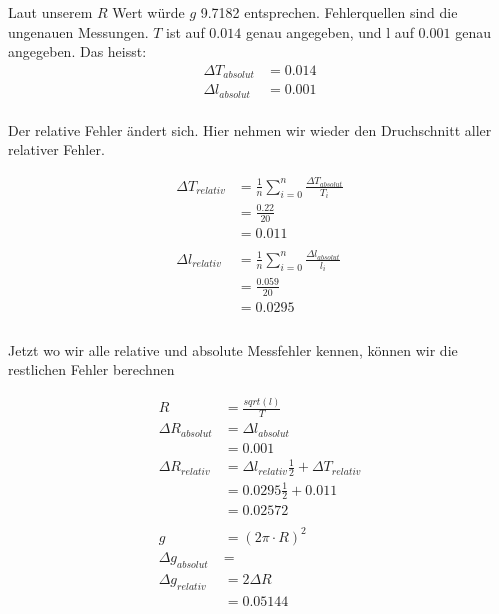 \documentclass[12pt, a4paper, twoside]{article}
\begin{document}
Laut unserem $R$ Wert würde $g$ 9.7182 entsprechen. Fehlerquellen sind die ungenauen Messungen.
$T$ ist auf $0.014$ genau angegeben, und l auf $0.001$ genau angegeben.
Das heisst:
\begin{align*}
  \Delta T_{absolut} & = 0.014 \\
  \Delta l_{absolut} & = 0.001 \\
\end{align*}

Der relative Fehler ändert sich. Hier nehmen wir wieder den Druchschnitt aller relativer Fehler.

\begin{align*}
  \Delta T_{relativ} & = \frac{1}{n}\sum_{i=0}^{n}\frac{\Delta T_{absolut}}{T_i} \\
                     & = \frac{0.22}{20}                                         \\
                     & = 0.011                                                   \\
  \\
  \Delta l_{relativ} & = \frac{1}{n}\sum_{i=0}^{n}\frac{\Delta l_{absolut}}{l_i} \\
                     & = \frac{0.059}{20}                                        \\
                     & = 0.0295                                                  \\
  \\
\end{align*}

Jetzt wo wir alle relative und absolute Messfehler kennen, können wir die restlichen Fehler berechnen

\begin{align*}
  R                  & = \frac{sqrt(l)}{T}                                \\
  \Delta R_{absolut} & = \Delta l_{absolut}                               \\
                     & = 0.001                                            \\
  \Delta R_{relativ} & = \Delta l_{relativ}\frac{1}{2}+\Delta T_{relativ} \\
                     & = 0.0295\frac{1}{2} + 0.011                        \\
                     & = 0.02572                                          \\
  \\
  g                  & = (2\pi\cdot R)^2                                  \\
  \Delta g_{absolut} & =                                                  \\
  \Delta g_{relativ} & = 2\Delta R                                        \\
                     & = 0.05144                                          \\
\end{align*}
\end{document}
